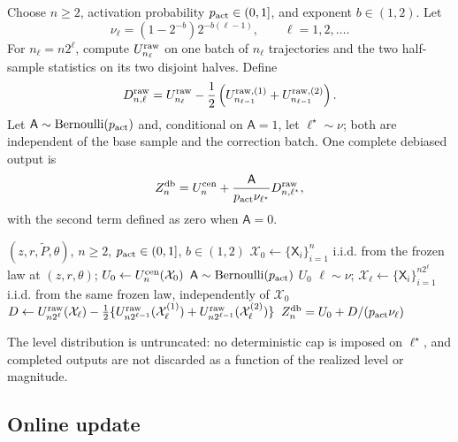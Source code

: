 Choose $n\ge2$, activation probability $p_{\rm act}\in(0,1]$, and exponent $b\in(1,2)$.  Let
\begin{equation}\label{eq:level-probabilities}
 \nu_\ell=(1-2^{-b})2^{-b(\ell-1)},
 \qquad \ell=1,2,\ldots.
\end{equation}
For $n_\ell=n2^\ell$, compute $U_{n_\ell}^{\rm raw}$ on one batch of $n_\ell$ trajectories and the two half-sample statistics on its two disjoint halves.  Define
\begin{equation}\label{eq:raw-level-difference}
 D_{n,\ell}^{\rm raw}
 =U_{n_\ell}^{\rm raw}
 -\frac12\left(
 U_{n_{\ell-1}}^{\rm raw,(1)}
 +U_{n_{\ell-1}}^{\rm raw,(2)}
 \right).
\end{equation}
Let $\mathsf A\sim\operatorname{Bernoulli}(p_{\rm act})$ and, conditional on $\mathsf A=1$, let $\ell^\star\sim\nu$; both are independent of the base sample and the correction batch.  One complete debiased output is
\begin{equation}\label{eq:debiased-output}
 Z_n^{\mathrm{db}}
 =U_n^{\rm cen}
 +\frac{\mathsf A}{p_{\rm act}\nu_{\ell^\star}}D_{n,\ell^\star}^{\rm raw},
\end{equation}
with the second term defined as zero when $\mathsf A=0$.

\begin{algorithm}[H]
\caption{One centered-LOO debiased CPT-gradient output}\label{alg:cloo-rd}
\begin{algorithmic}[1]
\Require $(z,r,\widetilde P,\theta)$, $n\ge2$, $p_{\rm act}\in(0,1]$, $b\in(1,2)$
\State $\mathcal X_0\gets\{\mathsf X_i\}_{i=1}^{n}$ i.i.d. from the frozen law at $(z,r,\theta)$; \quad $U_0\gets U_n^{\rm cen}(\mathcal X_0)$
\State $\mathsf A\sim\operatorname{Bernoulli}(p_{\rm act})$
    \State \Return $U_0$
\EndIf
\State $\ell\sim\nu$; \quad $\mathcal X_\ell\gets\{\mathsf X_i\}_{i=1}^{n2^\ell}$ i.i.d. from the same frozen law, independently of $\mathcal X_0$
\State $D\gets U_{n2^\ell}^{\rm raw}(\mathcal X_\ell)-\tfrac12\{U_{n2^{\ell-1}}^{\rm raw}(\mathcal X_\ell^{(1)})+U_{n2^{\ell-1}}^{\rm raw}(\mathcal X_\ell^{(2)})\}$
\State \Return $Z_n^{\mathrm{db}}=U_0+D/(p_{\rm act}\nu_\ell)$
\end{algorithmic}
\end{algorithm}

The level distribution is untruncated: no deterministic cap is imposed on $\ell^\star$, and completed outputs are not discarded as a function of the realized level or magnitude.

\subsection{Online update}

